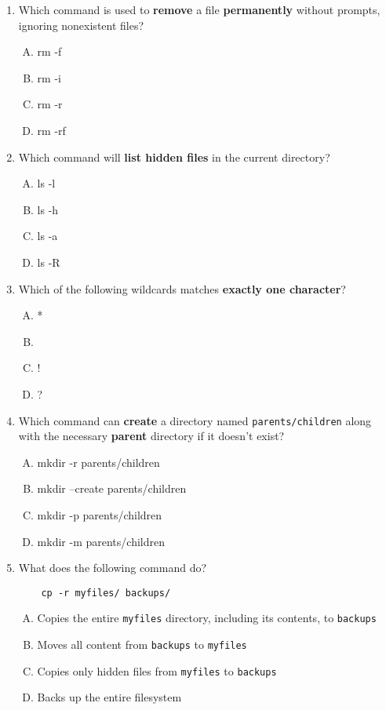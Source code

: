 \documentclass[a4paper]{report}
\begin{document}
\begin{enumerate}[1.]
    \item Which command is used to \textbf{remove} a file \textbf{permanently} without prompts, ignoring nonexistent files?  
    \begin{enumerate}[A)]
        \item rm -f  
        \item rm -i  
        \item rm -r  
        \item rm -rf  
    \end{enumerate}

    \item Which command will \textbf{list hidden files} in the current directory?  
    \begin{enumerate}[A)]
        \item ls -l  
        \item ls -h  
        \item ls -a  
        \item ls -R  
    \end{enumerate}

    \item Which of the following wildcards matches \textbf{exactly one character}?  
    \begin{enumerate}[A)]
        \item *  
        \item [ ]  
        \item !  
        \item ?  
    \end{enumerate}

    \item Which command can \textbf{create} a directory named \texttt{parents/children} along with the necessary \textbf{parent} directory if it doesn’t exist?  
    \begin{enumerate}[A)]
        \item mkdir -r parents/children  
        \item mkdir --create parents/children  
        \item mkdir -p parents/children  
        \item mkdir -m parents/children  
    \end{enumerate}

    \item What does the following command do?  
    \begin{verbatim}
    cp -r myfiles/ backups/
    \end{verbatim}
    \begin{enumerate}[A)]
        \item Copies the entire \texttt{myfiles} directory, including its contents, to \texttt{backups}  
        \item Moves all content from \texttt{backups} to \texttt{myfiles}  
        \item Copies only hidden files from \texttt{myfiles} to \texttt{backups}  
        \item Backs up the entire filesystem  
    \end{enumerate}


\end{enumerate}
\end{document}
